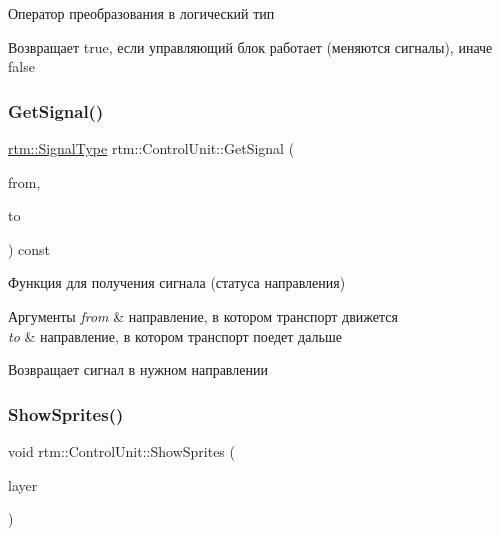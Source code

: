 Оператор преобразования в логический тип \begin{DoxyReturn}{Возвращает}
true, если управляющий блок работает (меняются сигналы), иначе false 
\end{DoxyReturn}
\mbox{\label{classrtm_1_1_control_unit_afa3dcc399f2f5b7d0c1451aa65977da6}} 
\subsubsection{\texorpdfstring{Get\+Signal()}{GetSignal()}}
{\footnotesize\ttfamily \hyperlink{namespacertm_aadb7300c15d57429546fb0b7f8ee0ee6}{rtm\+::\+Signal\+Type} rtm\+::\+Control\+Unit\+::\+Get\+Signal (\begin{DoxyParamCaption}\item[{\hyperlink{namespacertm_a57b216f3aeb45041f3461bab08bc3aeb}{Direction\+Type}}]{from,  }\item[{\hyperlink{namespacertm_a57b216f3aeb45041f3461bab08bc3aeb}{Direction\+Type}}]{to }\end{DoxyParamCaption}) const}

Функция для получения сигнала (статуса направления) 
\begin{DoxyParams}{Аргументы}
{\em from} & направление, в котором транспорт движется \\
\hline
{\em to} & направление, в котором транспорт поедет дальше \\
\hline
\end{DoxyParams}
\begin{DoxyReturn}{Возвращает}
сигнал в нужном направлении 
\end{DoxyReturn}
\mbox{\label{classrtm_1_1_control_unit_af126b136af6883970ded2a592c90d2b1}} 
\subsubsection{\texorpdfstring{Show\+Sprites()}{ShowSprites()}}
{\footnotesize\ttfamily void rtm\+::\+Control\+Unit\+::\+Show\+Sprites (\begin{DoxyParamCaption}\item[{cocos2d\+::\+Layer $\ast$const}]{layer }\end{DoxyParamCaption})}

